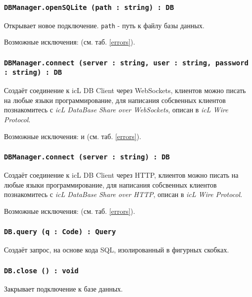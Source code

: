 \subsubsection{\texttt{DBManager.openSQLite (path : string) : DB}}

Открывает новое подключение. \texttt{path} - путь к файлу базы данных.

Возможные исключения:  (см. таб. \ref{errors}).

\subsubsection{\texttt{DBManager.connect (server : string, user : string, password : string) : DB}}

Создаёт соединение к icL DB Client через WebSockets, клиентов можно писать на любые языки программирование, для написания собсвенных клиентов познакомитесь с \textit{icL DataBase Share over WebSockets}, описан в \textit{icL Wire Protocol}.

Возможные исключения:  и  (см. таб. \ref{errors}).

\subsubsection{\texttt{DBManager.connect (server : string) : DB}}

Создаёт соединение к icL DB Client через HTTP, клиентов можно писать на любые языки программирование, для написания собсвенных клиентов познакомитесь с \textit{icL DataBase Share over HTTP}, описан в \textit{icL Wire Protocol}.

Возможные исключения:  (см. таб. \ref{errors}).

\subsubsection{\texttt{DB.query (q : Code) : Query}}

Создаёт запрос, на основе кода SQL, изолированный в фигурных скобках.

\subsubsection{\texttt{DB.close () : void}}

Закрывает подключение к базе данных.

